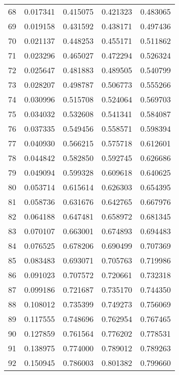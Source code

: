 \begin{center}
\begin{tabular}{|c|c|c|c|c|}
    68    & 0.017341   & 0.415075     & 0.421323     & 0.483065 \\ 
    69    & 0.019158   & 0.431592     & 0.438171     & 0.497436 \\ 
    70    & 0.021137   & 0.448253     & 0.455171     & 0.511862 \\ 
    71    & 0.023296   & 0.465027     & 0.472294     & 0.526324 \\ 
    72    & 0.025647   & 0.481883     & 0.489505     & 0.540799 \\ 
    73    & 0.028207   & 0.498787     & 0.506773     & 0.555266 \\ 
    74    & 0.030996   & 0.515708     & 0.524064     & 0.569703 \\ 
    75    & 0.034032   & 0.532608     & 0.541341     & 0.584087 \\ 
    76    & 0.037335   & 0.549456     & 0.558571     & 0.598394 \\ 
    77    & 0.040930   & 0.566215     & 0.575718     & 0.612601 \\ 
    78    & 0.044842   & 0.582850     & 0.592745     & 0.626686 \\ 
    79    & 0.049094   & 0.599328     & 0.609618     & 0.640625 \\ 
    80    & 0.053714   & 0.615614     & 0.626303     & 0.654395 \\ 
    81    & 0.058736   & 0.631676     & 0.642765     & 0.667976 \\ 
    82    & 0.064188   & 0.647481     & 0.658972     & 0.681345 \\ 
    83    & 0.070107   & 0.663001     & 0.674893     & 0.694483 \\ 
    84    & 0.076525   & 0.678206     & 0.690499     & 0.707369 \\ 
    85    & 0.083483   & 0.693071     & 0.705763     & 0.719986 \\ 
    86    & 0.091023   & 0.707572     & 0.720661     & 0.732318 \\ 
    87    & 0.099186   & 0.721687     & 0.735170     & 0.744350 \\ 
    88    & 0.108012   & 0.735399     & 0.749273     & 0.756069 \\ 
    89    & 0.117555   & 0.748696     & 0.762954     & 0.767465 \\ 
    90    & 0.127859   & 0.761564     & 0.776202     & 0.778531 \\ 
    91    & 0.138975   & 0.774000     & 0.789012     & 0.789263 \\ 
    92    & 0.150945   & 0.786003     & 0.801382     & 0.799660 \\ 

\end{tabular}
\end{center}

